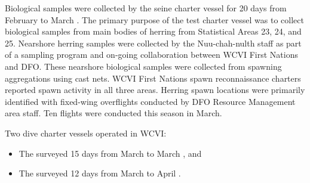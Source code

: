 Biological samples were collected by the seine charter vessel 
for 20 days from February  to March .
The primary purpose of the test charter vessel was to
collect biological samples from main bodies of herring from
Statistical Areas 23, 24, and 25.
Nearshore herring samples were collected by the Nuu-chah-nulth staff as
part of a sampling program and on-going collaboration
between WCVI First Nations and DFO.
These nearshore biological samples were collected from
spawning aggregations using cast nets.
WCVI First Nations spawn reconnaissance charters reported
spawn activity in all three areas.
Herring spawn locations were primarily identified with
fixed-wing overflights conducted by
DFO Resource Management area staff.
Ten flights were conducted this season in March.

Two dive charter vessels operated in WCVI:

\begin{itemize}

\item The  surveyed 15 days from March  to March , and

\item The  surveyed 12 days from March  to April .

\end{itemize}
